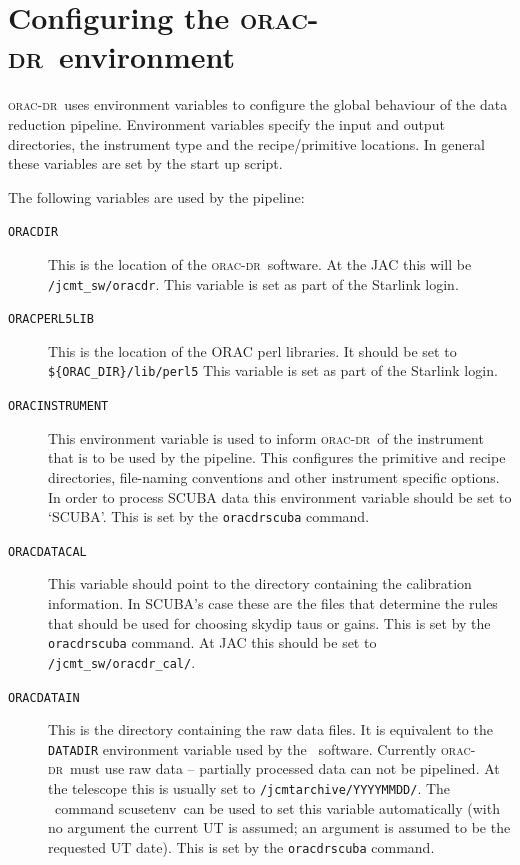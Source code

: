 \documentclass[twoside,11pt]{article}
\newcommand{\xref}[3]{#1}
\newcommand{\xlabel}[1]{}
\renewcommand{\_}{\texttt{\symbol{95}}}
\newcommand{\oracdr}{\xref{\textsc{orac-dr}}{sun230}{}}
\newcommand{\task}[1]{{\textsf{#1}}}
\newcommand{\SURF}{\xref{{\sc{Surf}}}{sun216}{}}
\newcommand{\scusetenv}{\xref{\task{scusetenv}}{sun216}{SCUSETENV}}
\begin{document}
\section{Configuring the \oracdr\ environment\xlabel{configuring_the_orac_dr_environment}}

\oracdr\ uses environment variables to configure the global behaviour
of the data reduction pipeline. Environment variables specify the input
and output directories, the instrument type and the recipe/primitive
locations. In general these variables are set by the start up script.

The following variables are used by the pipeline:


\begin{description}
\item[\texttt{ORAC\_DIR}] \mbox{}

This is the location of the \oracdr\ software. At the JAC this will be
\verb|/jcmt_sw/oracdr|. This variable is set as part of the Starlink
login.

\item[\texttt{ORAC\_PERL5LIB}] \mbox{}

This is the location of the ORAC perl libraries. It should be set to
\verb|${ORAC_DIR}/lib/perl5|   %
This variable is set as part of the Starlink login.

\item[\texttt{ORAC\_INSTRUMENT}] \mbox{}

This environment variable is used to inform \oracdr\ of the instrument
that is to be used by the pipeline. This configures the primitive and recipe
directories, file-naming conventions and other instrument specific
options. In order to process SCUBA data this environment variable should
be set to `SCUBA'. This is set by the \texttt{oracdr\_scuba} command.

\item[\texttt{ORAC\_DATA\_CAL}] \mbox{}

This variable should point to the directory containing the calibration
information. In SCUBA's case these are the files that determine the rules 
that should be used for choosing skydip taus or gains. 
This is set by the \texttt{oracdr\_scuba} command.
At JAC this should be set to \verb|/jcmt_sw/oracdr_cal/|.

\item[\texttt{ORAC\_DATA\_IN}] \mbox{}

This is the directory containing the raw data files. It is equivalent
to the \texttt{DATADIR} environment variable used by the \SURF\ software. 
Currently \oracdr\ must use raw data -- partially processed data can not
be pipelined. At the telescope this is usually set to
\verb|/jcmtarchive/YYYYMMDD/|. The \SURF\ command \scusetenv\
can be used to set this variable automatically (with no argument
the current UT is assumed; an argument is assumed to be the requested
UT date). This is set by the \texttt{oracdr\_scuba} command.


\end{description}
\end{document}
